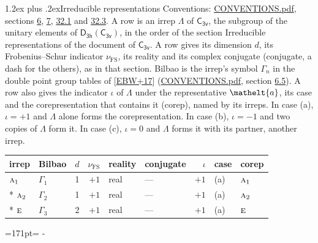 \documentclass[10pt,a4paper]{article}
\makeatletter
\renewcommand\section{\@startsection{section}{1}{\z@}{-3ex plus -1ex minus -.2ex}%
  {1.2ex plus .2ex}{\normalfont\large\sffamily\bfseries\color{parttitle}}}
\newcommand{\needspace}[1]{\par\penalty-100\begingroup\dimen0=#1\relax\dimen2=\pagegoal
  \advance\dimen2-\pagetotal\ifdim\dimen0>\dimen2\relax\ifdim\dimen2>0pt\vfil\break\fi\fi
  \endgroup}
\numberwithin{equation}{section}
\newcommand{\eltfont}[1]{{\let\sigma\eltsigma\mathelt{#1}}}
\newcommand{\grp}[1]{\mathsf{#1}}
\newcommand{\irr}[1]{\text{\normalfont\scshape #1}}
\newcommand{\elt}[1]{\eltfont{#1}}
\newcommand{\fsind}{\nu_{\mathrm{FS}}}
\makeatother
\begin{document}
\section{Irreducible representations}\label{s:irreps}
Conventions: \href{../../CONVENTIONS.pdf}{CONVENTIONS.pdf}, sections \href{../../../rotation/CONVENTIONS.pdf\#conv.6}{6}, \href{../../../rotation/CONVENTIONS.pdf\#conv.7}{7}, \href{../../CONVENTIONS.pdf\#conv.32.1}{32.1} and \href{../../CONVENTIONS.pdf\#conv.32.3}{32.3}.
\leavevmode\label{n:irrep.Delta}A row is an irrep $\Lambda$ of $\grp{C_{3v}}$, the subgroup of the unitary elements of $\grp{D_{3h}}(\grp{C_{3v}})$, in the order of the section Irreducible representations of the document of \href{../../../rotation/data/pdf/C3v.pdf}{$\grp{C_{3v}}$}. \label{n:index.dimension}\label{n:index.frobenius}\label{n:head.irrep}\label{n:head.reality}\label{n:head.conjugate}A row gives its dimension $d$, its Frobenius--Schur indicator $\fsind$, its reality and its complex conjugate (conjugate, a dash for the others), as in that section. \label{n:head.bilbao}\label{n:irrep.alias.gamma}Bilbao is the irrep's symbol $\Gamma_n$ in the double point group tables of [\href{../../../REFERENCES.pdf\#ref.EBW+17}{EBW+17}] (\href{../../CONVENTIONS.pdf}{CONVENTIONS.pdf}, section \href{../../../rotation/CONVENTIONS.pdf\#conv.6.5}{6.5}). \label{n:head.case.corep}\label{n:head.corep}A row also gives the indicator $\iota$ of $\Lambda$ under the representative $\elt{a}$, its case and the corepresentation that contains it (corep), named by its irreps. In case (a), $\iota = +1$ and $\Lambda$ alone forms the corepresentation. In case (b), $\iota = -1$ and two copies of $\Lambda$ form it. In case (c), $\iota = 0$ and $\Lambda$ forms it with its partner, another irrep.
\setlength{\emergencystretch}{2em}\par\setlength{\emergencystretch}{0pt}
{\small\renewcommand{\arraystretch}{1.25}\setlength{\tabcolsep}{4pt}\begin{longtable}{@{}llrrllrll@{}}\toprule
irrep & Bilbao & $d$ & $\fsind$ & reality & conjugate & $\iota$ & case & corep\\\midrule\endhead
\bottomrule\endfoot\endlastfoot
$\irr{a}_{1}$ & $\Gamma_{1}$ & 1 & $+1$ & real & --- & $+1$ & (a) & $\irr{a}_{1}$\\*
$\irr{a}_{2}$ & $\Gamma_{2}$ & 1 & $+1$ & real & --- & $+1$ & (a) & $\irr{a}_{2}$\\*
$\irr{e}$ & $\Gamma_{3}$ & 2 & $+1$ & real & --- & $+1$ & (a) & $\irr{e}$\\
\bottomrule\end{longtable}}
\needspace{171pt}
\end{document}
